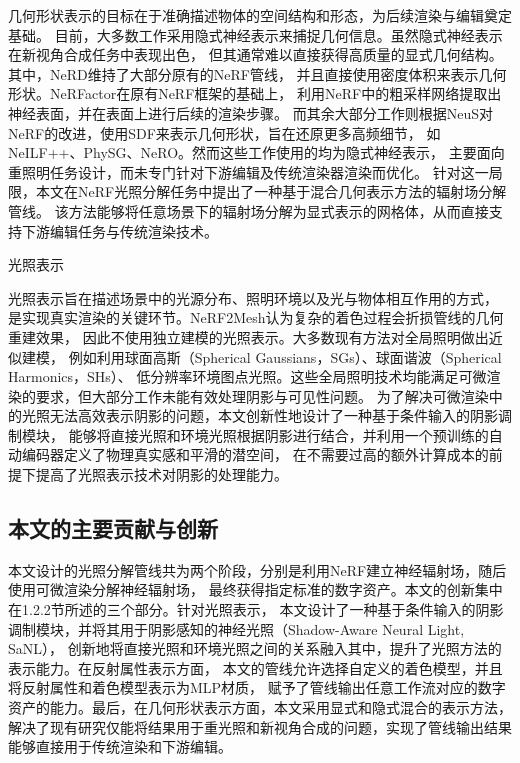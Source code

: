 几何形状表示的目标在于准确描述物体的空间结构和形态，为后续渲染与编辑奠定基础。
目前，大多数工作采用隐式神经表示来捕捉几何信息。虽然隐式神经表示在新视角合成任务中表现出色，
但其通常难以直接获得高质量的显式几何结构。其中，NeRD\cite{Boss_2021}维持了大部分原有的NeRF管线，
并且直接使用密度体积来表示几何形状。NeRFactor\cite{zhang2021nerfactor}在原有NeRF框架的基础上，
利用NeRF中的粗采样网络提取出神经表面，并在表面上进行后续的渲染步骤。
而其余大部分工作则根据NeuS\cite{10.5555/3540261.3542342}对NeRF的改进，使用SDF来表示几何形状，旨在还原更多高频细节，
如NeILF++\cite{Zhang_2023}、PhySG\cite{Zhang_2021}、NeRO\cite{Liu_2023}。然而这些工作使用的均为隐式神经表示，
主要面向重照明任务设计，而未专门针对下游编辑及传统渲染器渲染而优化。
针对这一局限，本文在NeRF光照分解任务中提出了一种基于混合几何表示方法的辐射场分解管线。
该方法能够将任意场景下的辐射场分解为显式表示的网格体，从而直接支持下游编辑任务与传统渲染技术。

光照表示

光照表示旨在描述场景中的光源分布、照明环境以及光与物体相互作用的方式，
是实现真实渲染的关键环节。NeRF2Mesh\cite{Tang_2023}认为复杂的着色过程会折损管线的几何重建效果，
因此不使用独立建模的光照表示。大多数现有方法对全局照明做出近似建模，
例如利用球面高斯（Spherical Gaussians，SGs）\cite{Boss_2021, Zhang_2021}、球面谐波（Spherical Harmonics，SHs）\cite{kuang2022neroic}、
低分辨率环境图点光照\cite{zhang2021nerfactor}。这些全局照明技术均能满足可微渲染的要求，但大部分工作未能有效处理阴影与可见性问题。
为了解决可微渲染中的光照无法高效表示阴影的问题，本文创新性地设计了一种基于条件输入的阴影调制模块，
能够将直接光照和环境光照根据阴影进行结合，并利用一个预训练的自动编码器定义了物理真实感和平滑的潜空间，
在不需要过高的额外计算成本的前提下提高了光照表示技术对阴影的处理能力。

\subsection{本文的主要贡献与创新}

本文设计的光照分解管线共为两个阶段，分别是利用NeRF建立神经辐射场，随后使用可微渲染分解神经辐射场，
最终获得指定标准的数字资产。本文的创新集中在1.2.2节所述的三个部分。针对光照表示，
本文设计了一种基于条件输入的阴影调制模块，并将其用于阴影感知的神经光照（Shadow-Aware Neural Light, SaNL），
创新地将直接光照和环境光照之间的关系融入其中，提升了光照方法的表示能力。在反射属性表示方面，
本文的管线允许选择自定义的着色模型，并且将反射属性和着色模型表示为MLP材质，
赋予了管线输出任意工作流对应的数字资产的能力。最后，在几何形状表示方面，本文采用显式和隐式混合的表示方法，
解决了现有研究仅能将结果用于重光照和新视角合成的问题，实现了管线输出结果能够直接用于传统渲染和下游编辑。

